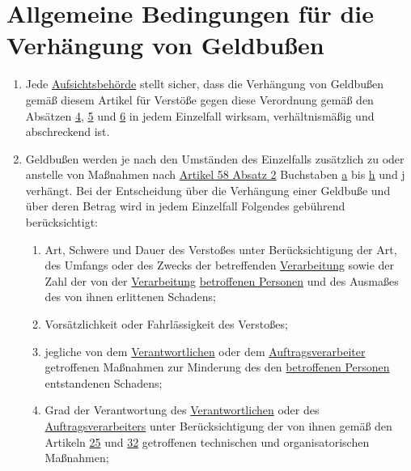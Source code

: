 \chapter{Allgemeine Bedingungen für die Verhängung von Geldbußen}
\label{ch:83}

\begin{enumerate}

  \item Jede \hyperref[itm:04-21]{Aufsichtsbehörde} stellt sicher, dass die Verhängung von Geldbußen gemäß diesem
   Artikel für Verstöße gegen diese Verordnung gemäß den Absätzen \hyperref[itm:83-4]{4}, \hyperref[itm:83-5]{5} und
   \hyperref[itm:83-6]{6} in jedem Einzelfall wirksam, verhältnismäßig und abschreckend ist.%
  \label{itm:83-1}

  \item Geldbußen werden je nach den Umständen des Einzelfalls zusätzlich zu oder anstelle von Maßnahmen nach \hyperref
   [itm:58-2]{Artikel 58 Absatz 2} Buchstaben \hyperref[itm:58-2a]{a} bis \hyperref[itm:58-2h]{h} und \hyperref
   [itm:58-2j]{j} verhängt. Bei der Entscheidung über die Verhängung einer Geldbuße und über deren Betrag wird in jedem
   Einzelfall Folgendes gebührend berücksichtigt:%
  \label{itm:83-2}

  \begin{enumerate}
  
    \item Art, Schwere und Dauer des Verstoßes unter Berücksichtigung der Art, des Umfangs oder des Zwecks der
     betreffenden \hyperref[itm:04-2]{Verarbeitung} sowie der Zahl der von der \hyperref[itm:04-2]
     {Verarbeitung} \hyperref[itm:04-1]{betroffenen Personen} und des Ausmaßes des von ihnen erlittenen Schadens;%
    \label{itm:83-2a}

    \item Vorsätzlichkeit oder Fahrlässigkeit des Verstoßes;%
    \label{itm:83-2b}

    \item jegliche von dem \hyperref[itm:04-7]{Verantwortlichen} oder dem \hyperref[itm:04-8]
     {Auftragsverarbeiter} getroffenen Maßnahmen zur Minderung des den
     \hyperref[itm:04-1]{betroffenen Personen} entstandenen Schadens;%
    \label{itm:83-2c}

    \item Grad der Verantwortung des \hyperref[itm:04-7]{Verantwortlichen} oder des \hyperref[itm:04-8]
     {Auftragsverarbeiters} unter Berücksichtigung der von ihnen gemäß den Artikeln \hyperref[ch:25]{25} und \hyperref
     [ch:32]{32} getroffenen technischen und organisatorischen Maßnahmen;%
    \label{itm:83-2d}


\end{enumerate}
\end{enumerate}
